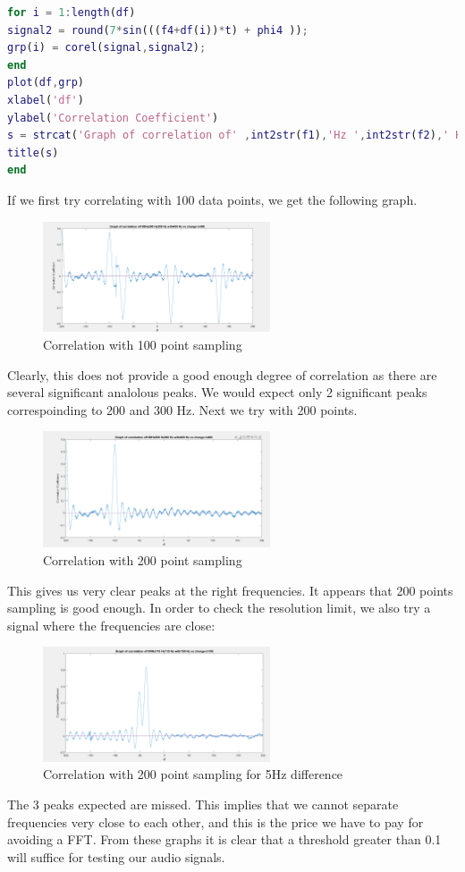 \begin{itemize}
\begin{lstlisting}[language=Matlab]
for i = 1:length(df)
signal2 = round(7*sin(((f4+df(i))*t) + phi4 ));
grp(i) = corel(signal,signal2);
end
plot(df,grp)
xlabel('df')
ylabel('Correlation Coefficient')
s = strcat('Graph of correlation of' ,int2str(f1),'Hz ',int2str(f2),' Hz' ,int2str(f3), ' Hz with ',int2str(f4),' Hz vs change in ',int2str(f4));
title(s)
end
\end{lstlisting}
If we first try correlating with 100 data points, we get the following graph.
\begin{figure}[ht]
    \centering
    \includegraphics[width=0.6\textwidth]{fig/Graph2100pts.PNG}
    \caption{Correlation with 100 point sampling}
    \label{fig:100pts}
\end{figure}
Clearly, this does not provide a good enough degree of correlation as there are
several significant analolous peaks. We would expect only 2 significant peaks
correspoinding to 200 and 300 Hz. Next we try with 200 points. 
\begin{figure}[ht]
    \centering
    \includegraphics[width=0.6\textwidth]{fig/Graph1.PNG}
    \caption{Correlation with 200 point sampling}
    \label{fig:100pts}
\end{figure}
This gives us very clear peaks at the right frequencies. It appears that 200
points sampling is good enough. In order to check the resolution limit, we also
try a signal where the frequencies are close: 
\begin{figure}[ht]
    \centering
    \includegraphics[width=0.6\textwidth]{fig/LowResolutionGraph3200ots.PNG}
    \caption{Correlation with 200 point sampling for 5Hz difference}
    \label{fig:200ptslowres}
\end{figure}
The 3 peaks expected are missed. This implies that we cannot separate
frequencies very close to each other, and this is the price we have to pay for
avoiding a FFT. From these graphs it is clear that a threshold greater than 0.1
will suffice for testing our audio signals. 

\end{itemize}